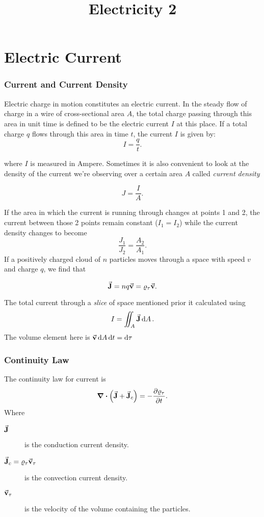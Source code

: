 \documentclass[a4paper,12pt]{article}
\title{Electricity 2}
\date{}
\begin{document}
\maketitle

\part{Electric Current}
\section{Current and Current Density}

Electric charge in motion constitutes an electric current. In the steady flow of
charge in a wire of cross-sectional area $A$, the total charge passing through this
area in unit time is defined to be the electric current $I$ at this place. If a total
charge $q$ flows through this area in time $t$, the current $I$ is given by:
\begin{equation}
	I = \frac{q}{t}
	.\end{equation}

where $I$ is measured in Ampere. Sometimes it is also convenient to look at the density of the current we're observing over a certain area $A$ called \emph{current density}

\begin{equation}
	J=\frac{I}{A}
	.\end{equation}

If the area in which the current is running through changes at points  1 and 2, the current between those 2 points remain constant ($I_1=I_2$) while the current density changes to become
\[
	\frac{J_1}{J_2}=\frac{A_2}{A_1}
	.\]
If a positively charged cloud of $n$ particles moves through a space with speed $v$ and charge $q$, we find that

\begin{equation}
	\va{J}=nq\va{v}=\varrho_\tau \va{v}
	.\end{equation}

The total current through a \emph{slice} of space mentioned prior it calculated using
\begin{equation}
	I=\iint_A \va{J}\dd{A}
	.\end{equation}
The volume element here is $\va{v}\dd {A}\dd {t}=\dd {\tau}$

\section{Continuity Law}
The continuity law for current is
\begin{equation}
	\div(\va{J}+\va{J}_c)=-\pdv{\varrho_\tau}{t}
	.\end{equation}
Where
\begin{description}
	\item[$\va{J}$ ] is the conduction current density.
	\item[$\va{J}_c=\varrho_\tau\va{v}_\tau$ ] is the convection current density.
	\item [$\va{v}_\tau$] is the velocity of the volume containing the particles.
\end{description}
\end{document}
